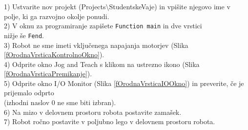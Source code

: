 \begin{mdframed}[backgroundcolor=green!20, shadow=true,roundcorner=8pt]
\end{mdframed}

\begin{mdframed}[backgroundcolor=blue!20, shadow=true,roundcorner=8pt]
        \vspace{0.2cm}
\hspace*{0.05cm} 1) Ustvarite nov projekt (Projects$\setminus$StudentskeVaje) in vpišite njegovo ime v \\ %
\hspace*{0.50cm} polje, ki ga razvojno okolje ponudi. \vspace*{0.3cm} \\ %
\hspace*{0.05cm} 2) V oknu za programiranje zapišete \texttt{Function main} in dve vrstici \\ %
\hspace*{0.5cm} nižje še \texttt{Fend}.  \vspace*{0.3cm} \\ %
\hspace*{0.05cm} 3) Robot ne sme imeti vključenega napajanja motorjev (Slika \ref{fOrodnaVrsticaKontrolnoOkno}). \vspace*{0.3cm} \\ %
\hspace*{0.05cm} 4) Odprite okno Jog and Teach s klikom na ustrezno ikono (Slika \ref{fOrodnaVrsticaPremikanje}). \vspace*{0.3cm} \\ %
\hspace*{0.05cm} 5) Odprite okno I/O Monitor (Slika \ref{fOrodnaVrsticaIOOkno}) in preverite, če je prijemalo odprto \\ %
\hspace*{0.5cm} (izhodni naslov 0 ne sme biti izbran). \vspace*{0.3cm} \\ %
\hspace*{0.05cm} 6) Na mizo v delovnem prostoru robota postavite zamašek. \vspace*{0.3cm} \\ %
\hspace*{0.05cm} 7) Robot ročno postavite v poljubno lego v delovnem prostoru robota. \vspace*{0.3cm} \\ %

\end{mdframed}

